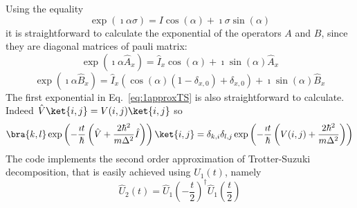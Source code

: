 Using the equality 
\begin{equation}
\exp(\imath \alpha \sigma) = I \cos(\alpha) + \imath \sigma \sin(\alpha)
\end{equation}
it is straightforward to calculate the exponential of the operators $A$ and $B$, since they are diagonal matrices of pauli matrix:
\begin{equation}
\exp\left(\imath \alpha \hat{A}_x \right) = \hat{I}_x \cos(\alpha) + \imath \sin(\alpha) \hat{A}_x
\end{equation}
\begin{equation}
\exp\left(\imath \alpha \hat{B}_x \right) = \hat{I}_x (\cos(\alpha)(1-\delta_{x,0}) + \delta_{x,0}) + \imath \sin(\alpha) \hat{B}_x
\end{equation}
The first exponential in Eq.~\eqref{eq:1approxTS} is also straightforward to calculate. Indeed $\hat{V} \ket{i,j} = V(i,j) \ket{i,j}$ so
\begin{equation}
\bra{k,l} \exp\left(-\frac{\imath t}{\hbar}\left(\hat{V} + \frac{2 \hbar^2}{m \Delta^2} \hat{I}\right) \right) \ket{i,j} = \delta_{k,i} \delta_{l,j} \exp\left( -\frac{\imath t}{\hbar} \left( V(i,j) + \frac{2 \hbar^2}{m \Delta^2} \right) \right)
\end{equation}
The code implements the second order approximation of Trotter-Suzuki decomposition, that is easily achieved using $U_1(t)$, namely
\begin{equation}
\hat{U}_2(t) = \hat{U}_1\left( -\frac{t}{2} \right)^\dagger \hat{U}_1\left(\frac{t}{2}\right)
\end{equation}

